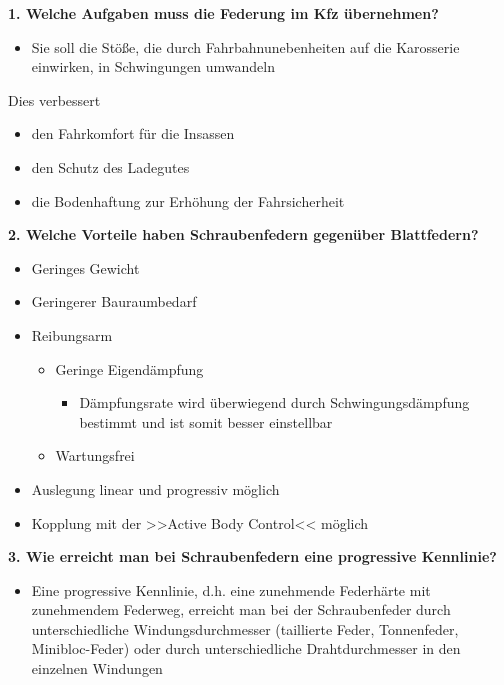 \textbf{1. Welche Aufgaben muss die Federung im Kfz übernehmen?}

\begin{itemize}
\item
  Sie soll die Stöße, die durch Fahrbahnunebenheiten auf die Karosserie
  einwirken, in Schwingungen umwandeln
\end{itemize}

Dies verbessert

\begin{itemize}
\item
  den Fahrkomfort für die Insassen
\item
  den Schutz des Ladegutes
\item
  die Bodenhaftung zur Erhöhung der Fahrsicherheit
\end{itemize}

\textbf{2. Welche Vorteile haben Schraubenfedern gegenüber Blattfedern?}

\begin{itemize}
\item
  Geringes Gewicht
\item
  Geringerer Bauraumbedarf
\item
  Reibungsarm

  \begin{itemize}
  \item
    Geringe Eigendämpfung

    \begin{itemize}
    \item
      Dämpfungsrate wird überwiegend durch Schwingungsdämpfung bestimmt
      und ist somit besser einstellbar
    \end{itemize}
  \item
    Wartungsfrei
  \end{itemize}
\item
  Auslegung linear und progressiv möglich
\item
  Kopplung mit der >>Active Body Control<< möglich
\end{itemize}

\textbf{3. Wie erreicht man bei Schraubenfedern eine progressive
Kennlinie?}

\begin{itemize}
\item
  Eine progressive Kennlinie, d.h. eine zunehmende Federhärte mit
  zunehmendem Federweg, erreicht man bei der Schraubenfeder durch
  unterschiedliche Windungsdurchmesser (taillierte Feder, Tonnenfeder,
  Minibloc-Feder) oder durch unterschiedliche Drahtdurchmesser in den
  einzelnen Windungen
\end{itemize}

